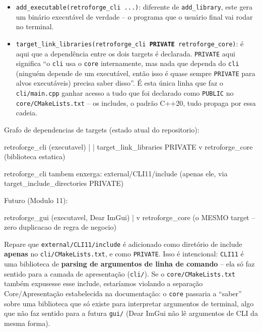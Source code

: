 
\begin{itemize}
    \item \texttt{add\_executable(retroforge\_cli ...)}: diferente de \texttt{add\_library}, este gera um binário executável de verdade -- o programa que o usuário final vai rodar no terminal.
    \item \texttt{target\_link\_libraries(retroforge\_cli \textbf{PRIVATE} retroforge\_core)}: é aqui que a dependência entre os dois targets é declarada. \texttt{PRIVATE} aqui significa ``o \texttt{cli} usa o \texttt{core} internamente, mas nada que dependa do \texttt{cli} (ninguém depende de um executável, então isso é quase sempre \texttt{PRIVATE} para alvos executáveis) precisa saber disso''. É esta única linha que faz o \texttt{cli/main.cpp} ganhar acesso a tudo que foi declarado como \texttt{PUBLIC} no \texttt{core/CMakeLists.txt} -- os includes, o padrão C++20, tudo propaga por essa cadeia.
\end{itemize}

\begin{CaixaArvore}
Grafo de dependencias de targets (estado atual do repositorio):

  retroforge_cli  (executavel)
        |
        | target_link_libraries PRIVATE
        v
  retroforge_core (biblioteca estatica)

  retroforge_cli tambem enxerga:
     external/CLI11/include  (apenas ele, via target_include_directories PRIVATE)

  Futuro (Modulo 11):

  retroforge_gui  (executavel, Dear ImGui)
        |
        v
  retroforge_core (o MESMO target -- zero duplicacao de regra de negocio)
\end{CaixaArvore}

\begin{CaixaAlerta}
Repare que \texttt{external/CLI11/include} é adicionado como diretório de include \textbf{apenas} no \texttt{cli/CMakeLists.txt}, e como \texttt{PRIVATE}. Isso é intencional: \texttt{CLI11} é uma biblioteca de \textbf{parsing de argumentos de linha de comando} -- ela só faz sentido para a camada de apresentação (\texttt{cli/}). Se o \texttt{core/CMakeLists.txt} também expusesse esse include, estaríamos violando a separação Core/Apresentação estabelecida na documentação: o \texttt{core} passaria a ``saber'' sobre uma biblioteca que só existe para interpretar argumentos de terminal, algo que não faz sentido para a futura \texttt{gui/} (Dear ImGui não lê argumentos de CLI da mesma forma).
\end{CaixaAlerta}

